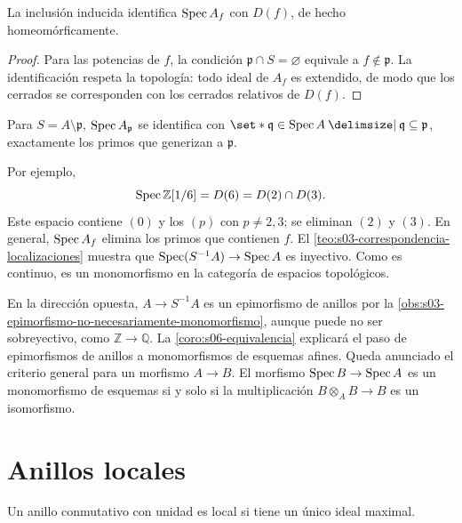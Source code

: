 \begin{coro}
\label{coro:s03-inclusion-inducida-identifica-f-d}
La inclusión inducida identifica $\operatorname{Spec} A_f$ con $D(f)$, de hecho homeomórficamente.
\end{coro}
\begin{proof}
Para las potencias de $f$, la condición $\mathfrak p\cap S=\varnothing$ equivale a $f\notin\mathfrak p$. La identificación respeta la topología: todo ideal de $A_f$ es extendido, de modo que los cerrados se corresponden con los cerrados relativos de $D(f)$.
\end{proof}

\begin{coro}
\label{coro:s03-s-p-p-identifica-q}
Para $S=A\setminus\mathfrak p$, $\operatorname{Spec} A_{\mathfrak p}$ se identifica con $\set*{\mathfrak q\in\Spec A \given \mathfrak q\subseteq\mathfrak p}$, exactamente los primos que generizan a $\mathfrak p$.
\end{coro}

\begin{obs}
\label{obs:s03-epimorfismo-vuelve-monomorfismo}
Por ejemplo,
\[
\operatorname{Spec}\mathbb Z[1/6]=D(6)=D(2)\cap D(3).
\]
Este espacio contiene $(0)$ y los $(p)$ con $p\ne2,3$; se eliminan $(2)$ y $(3)$. En general, $\operatorname{Spec} A_f$ elimina los primos que contienen $f$. El \cref{teo:s03-correspondencia-localizaciones} muestra que $\operatorname{Spec}(S^{-1}A)\to\operatorname{Spec} A$ es inyectivo. Como es continuo, es un monomorfismo en la categoría de espacios topológicos.

En la dirección opuesta, $A\to S^{-1}A$ es un epimorfismo de anillos por la \cref{obs:s03-epimorfismo-no-necesariamente-monomorfismo}, aunque puede no ser sobreyectivo, como $\mathbb Z\to\mathbb Q$. La \cref{coro:s06-equivalencia} explicará el paso de epimorfismos de anillos a monomorfismos de esquemas afines. Queda anunciado el criterio general para un morfismo $A\to B$. El morfismo $\operatorname{Spec} B\to\operatorname{Spec} A$ es un monomorfismo de esquemas si y solo si la multiplicación $B\otimes_A B\to B$ es un isomorfismo.
\end{obs}

\section{Anillos locales}

\begin{defi}
\label{defi:s03-anillo-conmutativo-unidad-local-tiene}
Un anillo conmutativo con unidad es local si tiene un único ideal maximal.
\end{defi}


